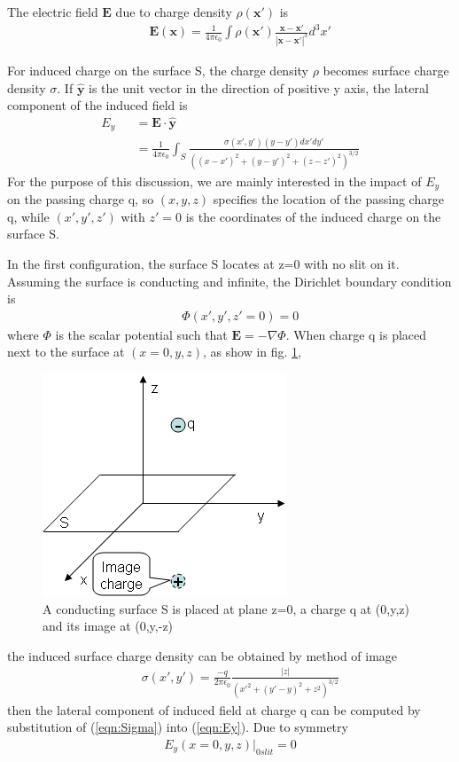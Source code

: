 \documentclass[prd,showpacs,twocolumn]{revtex4-1}
\begin{document}
The electric field $\mathbf E$ due to charge density $\rho(\mathbf{x'})$ is\cite{Jackson}
\begin{eqnarray}
&&\mathbf{E(x)}=\frac{1}{4\pi\epsilon_0}\int\rho(\mathbf{x'})\frac{\mathbf{x-x'}}{|\mathbf{x-x'}|^3}d^3x'
\label{eqn:Coulomb}
\end{eqnarray}

For induced charge on the surface S, the charge density $\rho$ becomes surface charge density $\sigma$. If $\hat{\mathbf y}$ is the unit vector in the direction of positive y axis, the lateral component of the induced field is
\begin{eqnarray}
E_y&&=\mathbf E\cdot\hat{\mathbf y}\nonumber\\
&&=\frac{1}{4\pi\epsilon_0}\int_S \frac{\sigma(x',y')(y-y')dx'dy'}{((x-x')^2+(y-y')^2+(z-z')^2)^{3/2}}
\label{eqn:Ey}
\end{eqnarray}
For the purpose of this discussion, we are mainly interested in the impact of $E_y$ on the passing charge q, so $(x,y,z)$ specifies the location of the passing charge q, while $(x',y',z')$ with $z'=0$ is the coordinates of the induced charge on the surface S.

In the first configuration, the surface S locates at z=0 with no slit on it. Assuming the surface is conducting and infinite, the Dirichlet boundary condition is
\begin{eqnarray}
&&\Phi(x',y',z'=0)=0
\label{eqn:Dirichlet0}
\end{eqnarray}
where $\Phi$ is the scalar potential such that $\mathbf E=-\nabla \Phi$. When charge q is placed next to the surface at $(x=0,y,z)$, as show in fig. \ref{fig:image},
\begin{figure}
\center
\includegraphics{noslit.png}
\caption{A conducting surface S is placed at plane z=0, a charge q at (0,y,z) and its image at (0,y,-z)}
\label{fig:image}
\end{figure}
the induced surface charge density can be obtained by method of image\cite{Jackson}
\begin{eqnarray}
&&\sigma(x',y')=\frac{-q}{2\pi\epsilon_0}\frac{|z|}{(x'^2+(y'-y)^2+z^2)^{3/2}}
\label{eqn:Sigma}
\end{eqnarray}
then the lateral component of induced field at charge q can be computed by substitution of (\ref{eqn:Sigma}) into (\ref{eqn:Ey}). Due to symmetry
\begin{eqnarray}
E_y(x=0,y,z)|_{0slit}=0
\label{eqn:Ey0}
\end{eqnarray}
\end{document}
